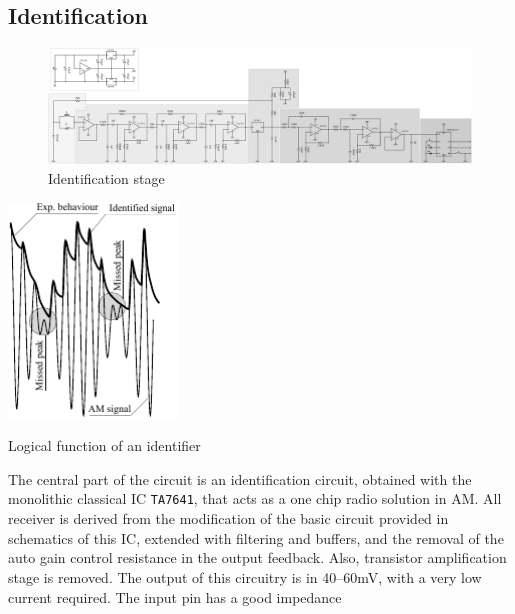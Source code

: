 \subsection{Identification}
\begin{figure}[h]
	\centering
	\includegraphics*[viewport=1251 3 1580 595,scale=0.4]{ch2/img/receiver3.pdf}
	\caption{Identification stage}
	\label{fig:identifier}
\end{figure}
\begin{marginfigure}
	\centering
	\includegraphics[width=4.5cm]{ch2/img/identificatore.pdf}
	\caption{Logical function of an identifier}
	\label{fig:identifier_log}
\end{marginfigure}
The central part of the circuit is an identification circuit, obtained with the monolithic classical IC \texttt{TA7641},  that acts as a one chip radio solution in AM. All receiver is derived from the modification of the basic circuit provided in schematics of this IC, extended with filtering and buffers, and the removal of the auto gain control resistance in the output feedback. Also, transistor amplification stage is removed. The output of this circuitry is in \numrange{40}{60}\si{\milli\volt}, with a very low current required. The input pin has a good impedance 

